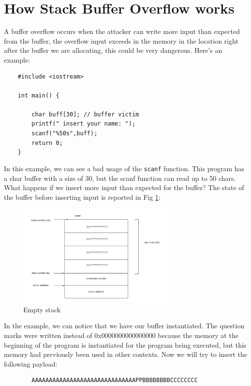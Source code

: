     \section{How Stack Buffer Overflow works}
    A buffer overflow occurs when the attacker can write more input than expected from the buffer, the overflow input exceeds in the memory in the location right after the buffer we are allocating, this could be very dangerous.\newline
    Here's an example:
    \begin{verbatim}
    #include <iostream>
    
    int main() {
    
        char buff[30]; // buffer victim 
        printf(" insert your name: ");
        scanf("%50s",buff); 
        return 0;
    }
    \end{verbatim}
    In this example, we can see a bad usage of the \texttt{scanf} function.\newline
    This program has a char buffer with a size of 30, but the scanf function can read up to 50 chars.\newline 
    What happens if we insert more input than expected for the buffer?\newline
    The state of the buffer before inserting input is reported in Fig \ref{fig:example_empty_buffer}:\newline
    \begin{figure}[h]
    \centering
    \includegraphics[width=8cm]{Images/chunk_wout_cacnary.png}
    \caption{Empty stack}
    \label{fig:example_empty_buffer}
    \end{figure}
       \clearpage
    In the example, we can notice that we have our buffer instantiated.\newline
    The question marks were written instead of 0x0000000000000000 because the memory at the beginning of the program is instantiated for the program being executed, but this memory had previously been used in other contexts.\newline
    Now we will try to insert the following payload:
    \begin{verbatim}
        AAAAAAAAAAAAAAAAAAAAAAAAAAAAAAPPBBBBBBBBCCCCCCCC
    \end{verbatim}
   
